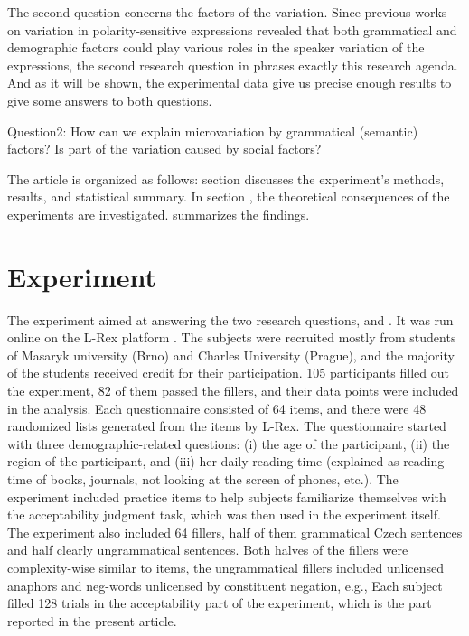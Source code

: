 The second question concerns the factors of the variation. Since previous works on variation in polarity-sensitive expressions revealed that both grammatical and demographic factors could play various roles in the speaker variation of the expressions, the second research question in  phrases exactly this research agenda. And as it will be shown, the experimental data give us precise enough results to give some answers to both questions.

\ea\label{ex-7} Question2: \ea How can we explain microvariation by grammatical
(semantic) factors? \ex Is part of the variation caused by social
factors? \z\z

The article is organized as follows: section  discusses the experiment's methods, results, and statistical summary. In section , the theoretical consequences of the experiments are investigated.  summarizes the findings.



\section{Experiment}\label{sec:experiment}

The experiment aimed at answering the two research questions,  and . It was run online on the L-Rex platform \citep{l-rex2023}. The subjects were recruited mostly from students of Masaryk university (Brno) and Charles University (Prague), and the majority of the students received credit for their participation. 105 participants filled out the experiment, 82 of them passed the fillers, and their data points were included in the analysis. Each questionnaire consisted of 64 items, and there were 48 randomized lists generated from the items by L-Rex. The questionnaire started with three demographic-related questions: (i) the age of the participant, (ii) the region of the participant, and (iii) her daily reading time (explained as reading time of books, journals, not looking at the screen of phones, etc.). The experiment included practice items to help subjects familiarize themselves with the acceptability judgment task, which was then used in the experiment itself. The experiment also included 64 fillers, half of them grammatical Czech sentences and half clearly ungrammatical sentences. Both halves of the fillers were complexity-wise similar to items, the ungrammatical fillers included unlicensed anaphors and neg-words unlicensed by constituent negation, e.g., Each subject filled 128 trials in the acceptability part of the experiment, which is the part reported in the present article.

